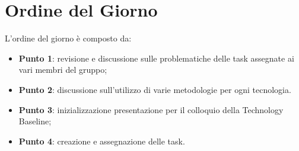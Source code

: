 \section{Ordine del Giorno}
L'ordine del giorno è composto da: 
\begin{itemize}
	\item \textbf{Punto 1}: revisione e discussione sulle problematiche delle task assegnate ai vari membri del gruppo; 
	\item \textbf{Punto 2}: discussione sull'utilizzo di varie metodologie per ogni tecnologia.  
	\item \textbf{Punto 3}: inizializzazione presentazione per il colloquio della Technology Baseline; 
	\item \textbf{Punto 4}: creazione e assegnazione delle task.
\end{itemize}